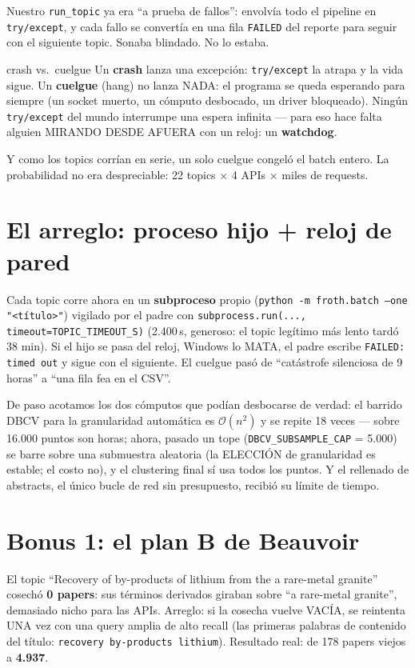 \documentclass[11pt,a4paper]{article}
\begin{document}
Nuestro \texttt{run\_topic} ya era ``a prueba de fallos'': envolvía todo el pipeline en
\texttt{try/except}, y cada fallo se convertía en una fila \texttt{FAILED} del reporte
para seguir con el siguiente topic. Sonaba blindado. No lo estaba.

\begin{concepto}{crash vs.\ cuelgue}
Un \textbf{crash} lanza una excepción: \texttt{try/except} la atrapa y la vida sigue.
Un \textbf{cuelgue} (hang) no lanza NADA: el programa se queda esperando para siempre
(un socket muerto, un cómputo desbocado, un driver bloqueado). Ningún
\texttt{try/except} del mundo interrumpe una espera infinita --- para eso hace falta
alguien MIRANDO DESDE AFUERA con un reloj: un \textbf{watchdog}.
\end{concepto}

Y como los topics corrían en serie, un solo cuelgue congeló el batch entero. La
probabilidad no era despreciable: 22 topics $\times$ 4 APIs $\times$ miles de requests.

\section{El arreglo: proceso hijo + reloj de pared}

Cada topic corre ahora en un \textbf{subproceso} propio
(\texttt{python -m froth.batch --one "<título>"}) vigilado por el padre con
\texttt{subprocess.run(..., timeout=TOPIC\_TIMEOUT\_S)} (2.400\,s, generoso: el topic
legítimo más lento tardó 38 min). Si el hijo se pasa del reloj, Windows lo MATA, el
padre escribe \texttt{FAILED: timed out} y sigue con el siguiente. El cuelgue pasó de
``catástrofe silenciosa de 9 horas'' a ``una fila fea en el CSV''.

De paso acotamos los dos cómputos que podían desbocarse de verdad:
el barrido DBCV para la granularidad automática es $\mathcal{O}(n^2)$ y se repite
18 veces --- sobre 16.000 puntos son horas; ahora, pasado un tope
(\texttt{DBCV\_SUBSAMPLE\_CAP} = 5.000) se barre sobre una submuestra aleatoria
(la ELECCIÓN de granularidad es estable; el costo no), y el clustering final sí usa
todos los puntos. Y el rellenado de abstracts, el único bucle de red sin presupuesto,
recibió su límite de tiempo.

\section{Bonus 1: el plan B de Beauvoir}

El topic ``Recovery of by-products of lithium from the a rare-metal granite'' cosechó
\textbf{0 papers}: sus términos derivados giraban sobre ``a rare-metal granite'', demasiado
nicho para las APIs. Arreglo: si la cosecha vuelve VACÍA, se reintenta UNA vez con una
query amplia de alto recall (las primeras palabras de contenido del título:
\texttt{recovery by-products lithium}). Resultado real: de 178 papers viejos a
\textbf{4.937}.
\end{document}
